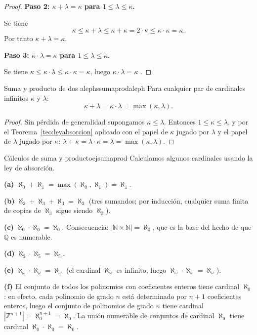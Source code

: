 \begin{proof}
\textbf{Paso 2: $\kappa + \lambda = \kappa$ para $1 \leq \lambda \leq \kappa$.}

Se tiene
\[
  \kappa \leq \kappa + \lambda \leq \kappa + \kappa = 2 \cdot \kappa \leq \kappa \cdot \kappa = \kappa.
\]
Por tanto $\kappa + \lambda = \kappa$.

\textbf{Paso 3: $\kappa \cdot \lambda = \kappa$ para $1 \leq \lambda \leq \kappa$.}

Se tiene $\kappa \leq \kappa \cdot \lambda \leq \kappa \cdot \kappa = \kappa$, luego $\kappa \cdot \lambda = \kappa$ \cite{jech2003, enderton1977}.
\end{proof}

\begin{corolario}{Suma y producto de dos alephs}{sumaprodaleph}
Para cualquier par de cardinales infinitos $\kappa$ y $\lambda$:
\[
  \kappa + \lambda = \kappa \cdot \lambda = \max(\kappa, \lambda).
\]
\end{corolario}

\begin{proof}
Sin pérdida de generalidad supongamos $\kappa \leq \lambda$. Entonces $1 \leq \kappa \leq \lambda$, y por el Teorema~\ref{teo:leyabsorcion} aplicado con el papel de $\kappa$ jugado por $\lambda$ y el papel de $\lambda$ jugado por $\kappa$: $\lambda + \kappa = \lambda \cdot \kappa = \lambda = \max(\kappa, \lambda)$.
\end{proof}

\begin{ejemplo}{Cálculos de suma y producto}{ejsumaprod}
Calculamos algunos cardinales usando la ley de absorción.

\textbf{(a)} $\aleph_0 + \aleph_1 = \max(\aleph_0, \aleph_1) = \aleph_1$.

\textbf{(b)} $\aleph_3 + \aleph_3 + \aleph_3 = \aleph_3$ (tres sumandos; por inducción, cualquier suma finita de copias de $\aleph_3$ sigue siendo $\aleph_3$).

\textbf{(c)} $\aleph_0 \cdot \aleph_0 = \aleph_0$. Consecuencia: $|\mathbb{N} \times \mathbb{N}| = \aleph_0$, que es la base del hecho de que $\mathbb{Q}$ es numerable.

\textbf{(d)} $\aleph_2 \cdot \aleph_5 = \aleph_5$.

\textbf{(e)} $\aleph_\omega \cdot \aleph_\omega = \aleph_\omega$ (el cardinal $\aleph_\omega$ es infinito, luego $\aleph_\omega \cdot \aleph_\omega = \aleph_\omega$).

\textbf{(f)} El conjunto de todos los polinomios con coeficientes enteros tiene cardinal $\aleph_0$: en efecto, cada polinomio de grado $n$ está determinado por $n+1$ coeficientes enteros, luego el conjunto de polinomios de grado $n$ tiene cardinal $|\mathbb{Z}^{n+1}| = \aleph_0^{n+1} = \aleph_0$. La unión numerable de conjuntos de cardinal $\aleph_0$ tiene cardinal $\aleph_0 \cdot \aleph_0 = \aleph_0$.
\end{ejemplo}

